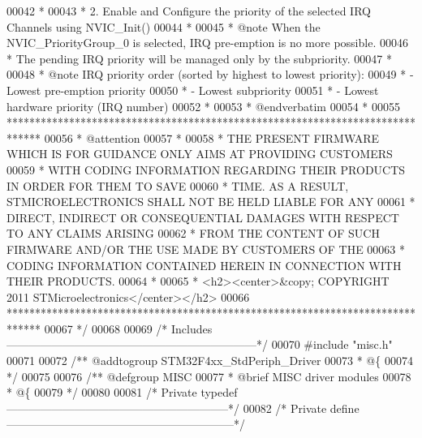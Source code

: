 \begin{DoxyCode}
00042 \textcolor{comment}{  *}
00043 \textcolor{comment}{  *            2. Enable and Configure the priority of the selected IRQ Channels using NVIC\_Init()  }
00044 \textcolor{comment}{  *}
00045 \textcolor{comment}{  * @note  When the NVIC\_PriorityGroup\_0 is selected, IRQ pre-emption is no more possible. }
00046 \textcolor{comment}{  *        The pending IRQ priority will be managed only by the subpriority.}
00047 \textcolor{comment}{  *}
00048 \textcolor{comment}{  * @note  IRQ priority order (sorted by highest to lowest priority):}
00049 \textcolor{comment}{  *         - Lowest pre-emption priority}
00050 \textcolor{comment}{  *         - Lowest subpriority}
00051 \textcolor{comment}{  *         - Lowest hardware priority (IRQ number)}
00052 \textcolor{comment}{  *}
00053 \textcolor{comment}{  *  @endverbatim}
00054 \textcolor{comment}{  *}
00055 \textcolor{comment}{  ******************************************************************************}
00056 \textcolor{comment}{  * @attention}
00057 \textcolor{comment}{  *}
00058 \textcolor{comment}{  * THE PRESENT FIRMWARE WHICH IS FOR GUIDANCE ONLY AIMS AT PROVIDING CUSTOMERS}
00059 \textcolor{comment}{  * WITH CODING INFORMATION REGARDING THEIR PRODUCTS IN ORDER FOR THEM TO SAVE}
00060 \textcolor{comment}{  * TIME. AS A RESULT, STMICROELECTRONICS SHALL NOT BE HELD LIABLE FOR ANY}
00061 \textcolor{comment}{  * DIRECT, INDIRECT OR CONSEQUENTIAL DAMAGES WITH RESPECT TO ANY CLAIMS ARISING}
00062 \textcolor{comment}{  * FROM THE CONTENT OF SUCH FIRMWARE AND/OR THE USE MADE BY CUSTOMERS OF THE}
00063 \textcolor{comment}{  * CODING INFORMATION CONTAINED HEREIN IN CONNECTION WITH THEIR PRODUCTS.}
00064 \textcolor{comment}{  *}
00065 \textcolor{comment}{  * <h2><center>&copy; COPYRIGHT 2011 STMicroelectronics</center></h2>}
00066 \textcolor{comment}{  ******************************************************************************}
00067 \textcolor{comment}{  */}
00068 
00069 \textcolor{comment}{/* Includes ------------------------------------------------------------------*/}
00070 \textcolor{preprocessor}{#}\textcolor{preprocessor}{include} "misc.h"
00071 
00072 \textcolor{comment}{/** @addtogroup STM32F4xx\_StdPeriph\_Driver}
00073 \textcolor{comment}{  * @\{}
00074 \textcolor{comment}{  */}
00075 
00076 \textcolor{comment}{/** @defgroup MISC }
00077 \textcolor{comment}{  * @brief MISC driver modules}
00078 \textcolor{comment}{  * @\{}
00079 \textcolor{comment}{  */}
00080 
00081 \textcolor{comment}{/* Private typedef -----------------------------------------------------------*/}
00082 \textcolor{comment}{/* Private define ------------------------------------------------------------*/}

\end{DoxyCode}
